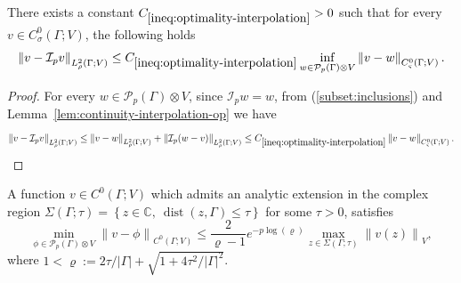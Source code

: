 \documentclass[final,onefignum,onetabnum]{mousaviart}
\begin{document}
			\vspace*{1mm}
			\begin{lemma}
				\label{lem:optimality-interpolation}
				There exists a constant $C_{\ref{ineq:optimality-interpolation}}>0$ such that for every $v \in C^0_\sigma\left( \Gamma; V \right)$, the following holds
				\begin{equation}
					\label{ineq:optimality-interpolation}
					\left\| v - \mathcal{I}_p v \right\|_{L_\rho^2(\Gamma; V)}
					\leq
					C_{\ref{ineq:optimality-interpolation}}
					\inf_{w \in \mathcal{P}_p(\Gamma) \otimes V}
					\left\| v - w \right\|_{C^0_\varsigma\left( \Gamma; V \right)}
					.  
				\end{equation}
			\end{lemma}
			
			\vspace*{1mm}
			\begin{proof}
				For every $w \in \mathcal{P}_p(\Gamma) \otimes V$, since $\mathcal{I}_p w = w$, from (\ref{subset:inclusions}) and Lemma~\ref{lem:continuity-interpolation-op} we have
				\begin{equation*}
					\left\| v - \mathcal{I}_p v \right\|_{L^2_\rho(\Gamma; V)} 
					\leq 
					\left\| v - w \right\|_{L^2_\rho(\Gamma; V)} 
					+
					\left\| \mathcal{I}_p(w - v) \right\|_{L^2_\rho(\Gamma; V)}
					\leq
					C_{\ref{ineq:optimality-interpolation}} \left\|  v - w  \right\|_{C^0_\varsigma\left( \Gamma; V \right)}.
				\end{equation*}
			\end{proof}
			
			\vspace*{1mm}
			\begin{lemma}
				\label{lem:bonded-domain-min-approx}
				A function $v \in C^0(\Gamma; V)$ which admits an analytic extension in the complex region $\Sigma \left( \Gamma; \tau \right) = \left\lbrace z \in \mathbb{C},~\operatorname{dist}(z, \Gamma) \leq \tau \right\rbrace $ for some $\tau>0$, satisfies
				\begin{equation}
					\label{ineq:bonded-domain-min-approx}
					\min_{\phi \in \mathcal{P}_p(\Gamma) \otimes V}
					\left\| v - \phi \right\|_{C^0\left( \Gamma; V \right)}
					\leq
					\dfrac{2}{\varrho - 1}e^{-p \log(\varrho)} 
					\max_{z \in \Sigma \left( \Gamma; \tau \right)} \left\| v(z)\right\|_V
					, 		
				\end{equation}
				where $1<\varrho := {2\tau}/{\left| \Gamma \right| } + \sqrt{1 + {4 \tau^2}/{\left|  \Gamma\right| ^2}}$.
			\end{lemma}
			
\end{document}
